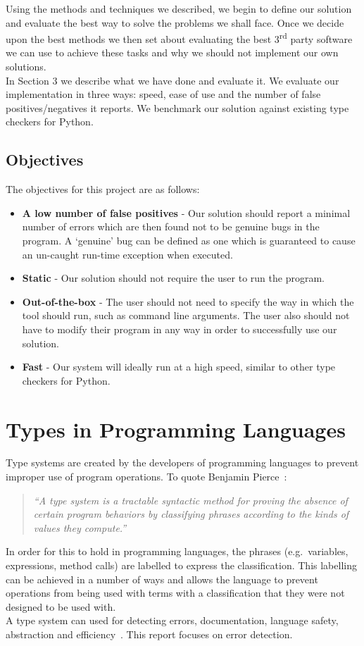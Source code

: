 \documentclass[12pt, titlepage]{article}
\begin{document}
\indent Using the methods and techniques we described, we begin to define our solution and evaluate the best way to solve the problems we shall face. Once we decide upon the best methods we then set about evaluating the best 3\textsuperscript{rd} party software we can use to achieve these tasks and why we should not implement our own solutions. \\
\indent In Section 3 we describe what we have done and evaluate it. We evaluate our implementation in three ways: speed, ease of use and the number of false positives/negatives it reports. We benchmark our solution against existing type checkers for Python.

\subsection{Objectives}
The objectives for this project are as follows:
\begin{itemize}
	\item \textbf{A low number of false positives} - Our solution should report a minimal number of errors which are then found not to be genuine bugs in the program. A `genuine' bug can be defined as one which is guaranteed to cause an un-caught run-time exception when executed.
	\item \textbf{Static} - Our solution should not require the user to run the program.
	\item \textbf{Out-of-the-box} - The user should not need to specify the way in which the tool should run, such as command line arguments. The user also should not have to modify their program in any way in order to successfully use our solution.
	\item \textbf{Fast} - Our system will ideally run at a high speed, similar to other type checkers for Python.
\end{itemize} 

\newpage
\section{Types in Programming Languages}
Type systems are created by the developers of programming languages to prevent improper use of program operations. To quote Benjamin Pierce~\cite{pierce02}:
\begin{quote}
	\emph{``A type system is a tractable syntactic method for proving the absence of certain program behaviors by classifying phrases according to the kinds of values they compute.''}
\end{quote}
In order for this to hold in programming languages, the phrases (e.g.\ variables, expressions, method calls) are labelled to express the classification. This labelling can be achieved in a number of ways and allows the language to prevent operations from being used with terms with a classification that they were not designed to be used with. \\
A type system can used for detecting errors, documentation, language safety, abstraction and efficiency~\cite{pierce02}. This report focuses on error detection.
\end{document}
